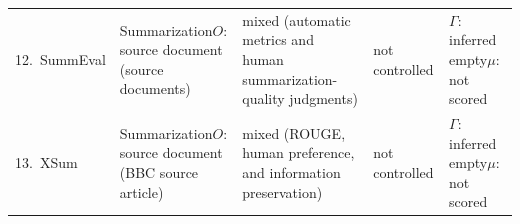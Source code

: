 \documentclass{clv2025}
\begin{document}
\begin{table}[t]
\begin{tabularx}{0.99\linewidth}{
  @{}P{0.17\textwidth}P{0.25\textwidth}
  P{0.15\textwidth}P{0.14\textwidth}Y@{}}
12.~SummEval \citep{fabbri_summeval_2021} & Summarization\newline $O$: source document (source documents) & mixed (automatic metrics and human summarization-quality judgments) & not controlled & $\Gamma$: inferred empty\newline $\mu$: not scored\\
13.~XSum \citep{narayan_xsum_2018} & Summarization\newline $O$: source document (BBC source article) & mixed (ROUGE, human preference, and information preservation) & not controlled & $\Gamma$: inferred empty\newline $\mu$: not scored\\
\bottomrule
\end{tabularx}
\end{table}
\end{document}

